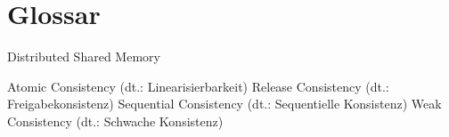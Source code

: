 \chapter{Glossar}


			{Distributed Shared Memory}

			{Atomic Consistency (dt.: Linearisierbarkeit)}
			{Release Consistency (dt.: Freigabekonsistenz)}
			{Sequential Consistency (dt.: Sequentielle Konsistenz)}
			{Weak Consistency (dt.: Schwache Konsistenz)}
